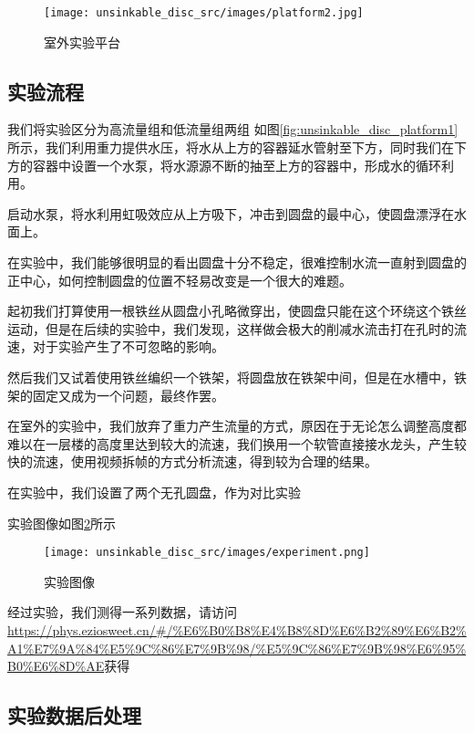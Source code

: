 \documentclass[UTF8]{gapd}
\begin{document}
\begin{figure}[!htbp]%
  \centering
  \texttt{[image: unsinkable\_disc\_src/images/platform2.jpg]}
  \caption{室外实验平台}
  \label{fig:unsinkable_disc_platform2}%
\end{figure}

\subsection{实验流程}
我们将实验区分为高流量组和低流量组两组
如图\ref{fig:unsinkable_disc_platform1}所示，我们利用重力提供水压，将水从上方的容器延水管射至下方，同时我们在下方的容器中设置一个水泵，将水源源不断的抽至上方的容器中，形成水的循环利用。

启动水泵，将水利用虹吸效应从上方吸下，冲击到圆盘的最中心，使圆盘漂浮在水面上。

在实验中，我们能够很明显的看出圆盘十分不稳定，很难控制水流一直射到圆盘的正中心，如何控制圆盘的位置不轻易改变是一个很大的难题。

起初我们打算使用一根铁丝从圆盘小孔略微穿出，使圆盘只能在这个环绕这个铁丝运动，但是在后续的实验中，我们发现，这样做会极大的削减水流击打在孔时的流速，对于实验产生了不可忽略的影响。

然后我们又试着使用铁丝编织一个铁架，将圆盘放在铁架中间，但是在水槽中，铁架的固定又成为一个问题，最终作罢。

在室外的实验中，我们放弃了重力产生流量的方式，原因在于无论怎么调整高度都难以在一层楼的高度里达到较大的流速，我们换用一个软管直接接水龙头，产生较快的流速，使用视频拆帧\cite{gh:SAE}的方式分析流速，得到较为合理的结果。

在实验中，我们设置了两个无孔圆盘，作为对比实验

实验图像如图\ref{fig:unsinkable_disc_experiment}所示
\begin{figure}[!htbp]%
  \centering
  \texttt{[image: unsinkable\_disc\_src/images/experiment.png]}
  \caption{实验图像}
  \label{fig:unsinkable_disc_experiment}%
\end{figure}

经过实验，我们测得一系列数据，请访问\url{https://phys.eziosweet.cn/#/%E6%B0%B8%E4%B8%8D%E6%B2%89%E6%B2%A1%E7%9A%84%E5%9C%86%E7%9B%98/%E5%9C%86%E7%9B%98%E6%95%B0%E6%8D%AE}获得

\subsection{实验数据后处理}
\end{document}
